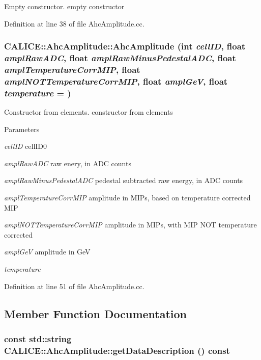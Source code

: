 Empty constructor. empty constructor 

Definition at line 38 of file AhcAmplitude.cc.
\subsubsection[{AhcAmplitude}]{\setlength{\rightskip}{0pt plus 5cm}CALICE::AhcAmplitude::AhcAmplitude (int {\em cellID}, \/  float {\em amplRawADC}, \/  float {\em amplRawMinusPedestalADC}, \/  float {\em amplTemperatureCorrMIP}, \/  float {\em amplNOTTemperatureCorrMIP}, \/  float {\em amplGeV}, \/  float {\em temperature} = {})}\label{classCALICE_1_1AhcAmplitude_a5b9ac2d65b9a1e5b9a778dc656790677}


Constructor from elements. constructor from elements


\begin{DoxyParams}{Parameters}
\item[{\em cellID}]cellID0 \item[{\em amplRawADC}]raw enery, in ADC counts \item[{\em amplRawMinusPedestalADC}]pedestal subtracted raw energy, in ADC counts \item[{\em amplTemperatureCorrMIP}]amplitude in MIPs, based on temperature corrected MIP \item[{\em amplNOTTemperatureCorrMIP}]amplitude in MIPs, with MIP NOT temperature corrected \item[{\em amplGeV}]amplitude in GeV \item[{\em temperature}]\end{DoxyParams}


Definition at line 51 of file AhcAmplitude.cc.

\subsection{Member Function Documentation}
\subsubsection[{getDataDescription}]{\setlength{\rightskip}{0pt plus 5cm}const std::string CALICE::AhcAmplitude::getDataDescription () const}\label{classCALICE_1_1AhcAmplitude_a90d5bda5b0fe75d075c0ee3f51e21154}


